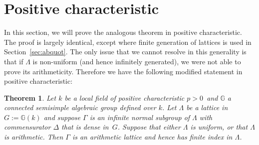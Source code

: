 \documentclass[11pt]{article}
\numberwithin{equation}{section}\providecommand{\llangle}{\langle\!\langle}\providecommand{\rrangle}{\rangle\!\rangle}\providecommand{\Asterisk}{\ast}
\newcommand{\bbG}{\ensuremath{\mathbb{G}}}
\newtheorem{thm}{Theorem}[section]
\theoremstyle{definition}
\begin{document}
\section{Positive characteristic}
\label{sec:char+}

In this section, we will prove the analogous theorem in positive characteristic. The proof is largely identical, except where finite generation of lattices is used in Section~\ref{sec:abquot}. The only issue that we cannot resolve in this generality is that if $\Lambda$ is non-uniform (and hence infinitely generated), we were not able to prove its arithmeticity. Therefore we have the following modified statement in positive characteristic:

\begin{thm}\label{thm:char+}
Let $k$ be a local field of positive characteristic $p>0$\, and $\bbG$ a connected semisimple algebraic group defined over $k$. Let $\Lambda$ be a lattice in $G:=\bbG(k)$ and suppose $\Gamma$ is an infinite normal subgroup of $\Lambda$ with commensurator $\Delta$ that is dense in~$G$. Suppose that either $\Lambda$ is uniform, or that $\Lambda$ is arithmetic. Then $\Gamma$ is an arithmetic lattice and hence has finite index in $\Lambda$.
\end{thm}
\end{document}
